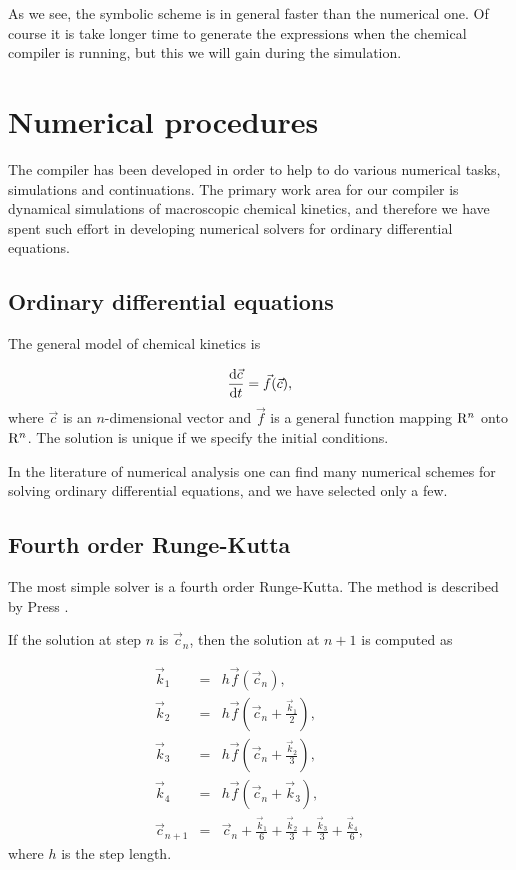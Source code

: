 As we see, the symbolic scheme is in general faster than the numerical
one. Of course it is take longer time to generate the expressions when
the chemical compiler is running, but this we will gain during the
simulation. 

\section{Numerical procedures}
\label{sec:NumProc}
The compiler has been developed in order to help to do various
numerical tasks, \ie simulations and continuations. The primary work
area for our compiler is dynamical simulations of macroscopic chemical
kinetics, and therefore we have spent such effort in developing
numerical solvers for ordinary differential equations.

\subsection{Ordinary differential equations}
\label{sec:ODEs}
The general model of chemical kinetics is

\[
  \frac{{\rm d}\vec{c}}{{\rm d}t} = \vec{f}(\vec{c}),
\]
where $\vec{c}$ is an $n$-dimensional vector and $\vec{f}$ is a
general function mapping ${\rm R}^n$ onto ${\rm R}^n$. The solution is unique if
we specify the initial conditions.

In the literature of numerical analysis one can find many numerical
schemes for solving ordinary differential equations, and we have
selected only a few. 


\subsection{Fourth order Runge-Kutta}
\label{sec:RK4}
The most simple solver is a fourth order Runge-Kutta. The method is
described \eg by Press \etal \cite[pp.\ 710--714]{NumAna:NumRec}. 

If the solution at step $n$ is $\vec{c}_n$, then the solution at $n+1$
is computed as

\begin{eqnarray*}
  \vec{k}_1 &=& h\vec{f}(\vec{c}_n), \\
  \vec{k}_2 &=& h\vec{f}(\vec{c}_n + \frac{\vec{k}_1}{2}), \\
  \vec{k}_3 &=& h\vec{f}(\vec{c}_n + \frac{\vec{k}_2}{3}), \\
  \vec{k}_4 &=& h\vec{f}(\vec{c}_n + \vec{k}_3), \\
  \vec{c}_{n+1} &=& \vec{c}_n + \frac{\vec{k}_1}{6} +
  \frac{\vec{k}_2}{3} + \frac{\vec{k}_3}{3} + \frac{\vec{k}_4}{6},
\end{eqnarray*}
where $h$ is the step length.

